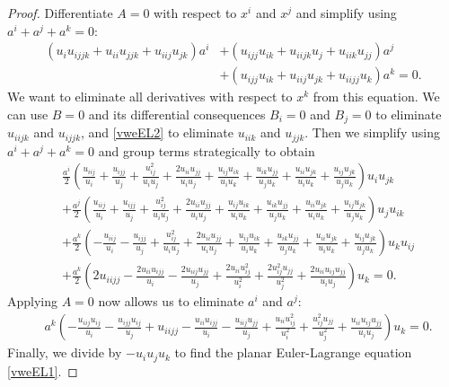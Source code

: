 \documentclass[10pt,a4paper]{amsart}
\begin{document}
\begin{proof}
	Differentiate $A= 0$ with respect to $x^i$ and $x^j$ and simplify using $a^i+a^j+a^k=0$:
	\begin{align*}
		{\left({u_{i}} {u_{ijjk}} + {u_{ii}} {u_{jjk}} + {u_{iij}} {u_{jk}}\right)} a^{i}
		&+ {\left({u_{ijj}} {u_{ik}} + {u_{iijk}} {u_{j}} + {u_{iik}} {u_{jj}}\right)} a^j \\
		&+ {\left({u_{ijj}} {u_{ik}} + {u_{iij}} {u_{jk}} + {u_{iijj}} {u_{k}}\right)} a^{k} = 0 .
	\end{align*}
	We want to eliminate all derivatives with respect to $x^k$ from this equation.	
	We can use $B=0$ and its differential consequences $B_i = 0$ and $B_j = 0$ to eliminate $u_{iijk}$ and $u_{ijjk}$, and \eqref{vweEL2} to eliminate $u_{iik}$ and $u_{jjk}$. Then we simplify using $a^i+a^j+a^k = 0$ and group terms strategically to obtain
	\begin{align*}
		&\frac{a^{i}}{2} {\left(\frac{{u_{iij}}}{u_i} + \frac{{u_{ijj}} }{{u_{j}}} + \frac{u_{ij}^2 }{u_i {u_{j}}}  + \frac{2 {u_{ii}} {u_{jj}} }{u_i {u_{j}}} + \frac{{u_{ij}} {u_{ik}} }{u_i {u_{k}}} + \frac{{u_{ik}} {u_{jj}} }{{u_{j}} {u_{k}}} + \frac{{u_{ii}} {u_{jk}}}{u_i {u_{k}}} + \frac{{u_{ij}} {u_{jk}}}{{u_{j}} {u_{k}}}\right)} u_i u_{jk}  \\
		& + \frac{a^j}{2} {\left(\frac{{u_{iij}}}{{u_{i}}} + \frac{u_{ijj}}{u_j} + \frac{u_{ij}^2 }{{u_{i}} u_j} + \frac{2 {u_{ii}} {u_{jj}}}{{u_{i}} u_j} + \frac{{u_{ij}} {u_{ik}}}{{u_{i}} {u_{k}}} + \frac{{u_{ik}} {u_{jj}}}{ u_j {u_{k}}} + \frac{{u_{ii}} {u_{jk}}}{{u_{i}} {u_{k}}} + \frac{{u_{ij}} {u_{jk}}}{ u_j {u_{k}}}\right)} u_j u_{ik}  \\
		&+ \frac{a^{k}}{2} {\left( - \frac{{u_{iij}}}{{u_{i}}} - \frac{{u_{ijj}}}{{u_{j}}} + \frac{u_{ij}^2}{{u_{i}} {u_{j}}} + \frac{2 {u_{ii}} {u_{jj}} }{{u_{i}} {u_{j}}} + \frac{{u_{ij}} {u_{ik}}}{{u_{i}} u_k} + \frac{{u_{ik}} {u_{jj}}}{{u_{j}} u_k} + \frac{{u_{ii}} {u_{jk}}}{{u_{i}} u_k} + \frac{{u_{ij}} {u_{jk}}}{{u_{j}} u_k}\right)} u_k u_{ij}  \\
		&+ \frac{a^{k}}{2} {\left( 2 {u_{iijj}} - \frac{2 {u_{ii}} {u_{ijj}} }{{u_{i}}} - \frac{2 {u_{iij}} {u_{jj}} }{{u_{j}}} + \frac{2 {u_{ii}} u_{ij}^2 }{u_{i}^2} + \frac{2 u_{ij}^2 {u_{jj}} }{u_{j}^2} + \frac{2 {u_{ii}} {u_{ij}} {u_{jj}}}{{u_{i}} {u_{j}}} \right)} u_k = 0 .
	\end{align*}
	Applying $A = 0$ now allows us to eliminate $a^i$ and $a^j$:
	\begin{align*}
		& a^{k} \left( - \frac{{u_{iij}} u_{ij}}{{u_{i}}} - \frac{{u_{ijj}} u_{ij}}{{u_{j}}} \mathrel{+}  {u_{iijj}} - \frac{{u_{ii}} {u_{ijj}} }{{u_{i}}} - \frac{ {u_{iij}} {u_{jj}} }{{u_{j}}} + \frac{{u_{ii}} u_{ij}^2 }{u_{i}^2} + \frac{u_{ij}^2 {u_{jj}} }{u_{j}^2} + \frac{{u_{ii}} {u_{ij}} {u_{jj}}}{{u_{i}} {u_{j}}} \right) u_k = 0 .
	\end{align*}
	Finally, we divide by $-u_i u_j u_k$ to find the planar Euler-Lagrange equation \eqref{vweEL1}.
\end{proof}
\end{document}
